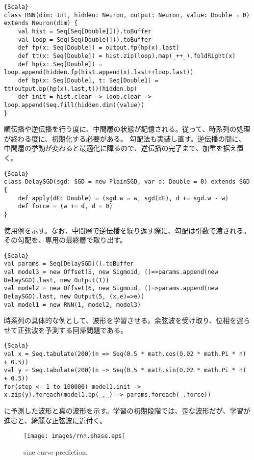 \documentclass[10pt,a4paper]{book}
\begin{document}
\begin{Verbatim}{Scala}
class RNN(dim: Int, hidden: Neuron, output: Neuron, value: Double = 0) extends Neuron(dim) {
	val hist = Seq[Seq[Double]]().toBuffer
	val loop = Seq[Seq[Double]]().toBuffer
	def fp(x: Seq[Double]) = output.fp(hp(x).last)
	def tt(x: Seq[Double]) = hist.zip(loop).map(_++_).foldRight(x)
	def hp(x: Seq[Double]) = loop.append(hidden.fp(hist.append(x).last++loop.last))
	def bp(x: Seq[Double], t: Seq[Double]) = tt(output.bp(hp(x).last,t))(hidden.bp)
	def init = hist.clear -> loop.clear -> loop.append(Seq.fill(hidden.dim)(value))
}
\end{Verbatim}

順伝播や逆伝播を行う度に、中間層の状態が記憶される。従って、時系列の処理が終わる度に、初期化する必要がある。
勾配法も実装し直す。逆伝播の間に、中間層の挙動が変わると最適化に障るので、逆伝播の完了まで、加重を据え置く。

\begin{Verbatim}{Scala}
class DelaySGD(sgd: SGD = new PlainSGD, var d: Double = 0) extends SGD {
	def apply(dE: Double) = (sgd.w = w, sgd(dE), d += sgd.w - w)
	def force = (w += d, d = 0)
}
\end{Verbatim}

使用例を示す。なお、中間層で逆伝播を繰り返す際に、勾配は引数で渡される。その勾配を、専用の最終層で取り出す。

\begin{Verbatim}{Scala}
val params = Seq[DelaySGD]().toBuffer
val model3 = new Offset(5, new Sigmoid, ()=>params.append(new DelaySGD).last, new Output(1))
val model2 = new Offset(6, new Sigmoid, ()=>params.append(new DelaySGD).last, new Output(5, (x,e)=>e))
val model1 = new RNN(1, model2, model3)
\end{Verbatim}

時系列の具体的な例として、波形を学習させる。余弦波を受け取り、位相を遅らせて正弦波を予測する回帰問題である。

\begin{Verbatim}{Scala}
val x = Seq.tabulate(200)(n => Seq(0.5 * math.cos(0.02 * math.Pi * n) + 0.5))
val y = Seq.tabulate(200)(n => Seq(0.5 * math.sin(0.02 * math.Pi * n) + 0.5))
for(step <- 1 to 100000) model1.init -> x.zip(y).foreach(model1.bp(_,_) -> params.foreach(_.force))
\end{Verbatim}

に予測した波形と真の波形を示す。学習の初期段階では、歪な波形だが、学習が進むと、綺麗な正弦波に近付く。

\begin{figure}[h]
\centering
\texttt{[image: images/rnn.phase.eps]}
\caption{sine curve prediction.\label{fig:rnn}}
\end{figure}
\end{document}
